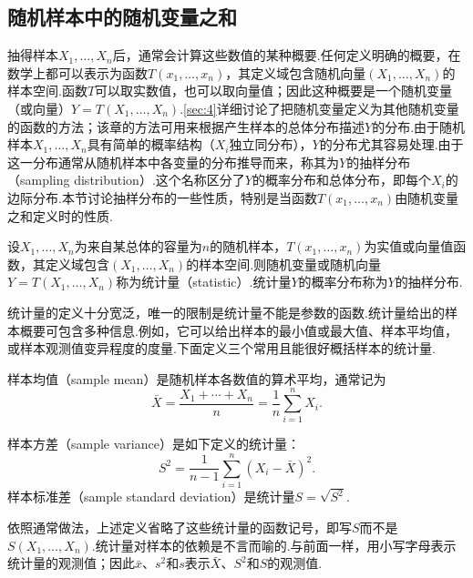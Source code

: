 \subsection{随机样本中的随机变量之和}\label{sec:5.2}
抽得样本$X_1,\ldots,X_n$后，通常会计算这些数值的某种概要.任何定义明确的概要，在数学上都可以表示为函数$T(x_1,\ldots,x_n)$，其定义域包含随机向量$(X_1,\ldots,X_n)$的样本空间.函数$T$可以取实数值，也可以取向量值；因此这种概要是一个随机变量（或向量）$Y=T(X_1,\ldots,X_n)$.\autoref{sec:4}详细讨论了把随机变量定义为其他随机变量的函数的方法；该章的方法可用来根据产生样本的总体分布描述$Y$的分布.由于随机样本$X_1,\ldots,X_n$具有简单的概率结构（$X_i$独立同分布），$Y$的分布尤其容易处理.由于这一分布通常从随机样本中各变量的分布推导而来，称其为$Y$的抽样分布（sampling distribution）.这个名称区分了$Y$的概率分布和总体分布，即每个$X_i$的边际分布.本节讨论抽样分布的一些性质，特别是当函数$T(x_1,\ldots,x_n)$由随机变量之和定义时的性质.
\begin{definition}\label{def:5.2.1}
设$X_1,\ldots,X_n$为来自某总体的容量为$n$的随机样本，$T(x_1,\ldots,x_n)$为实值或向量值函数，其定义域包含$(X_1,\ldots,X_n)$的样本空间.则随机变量或随机向量$Y=T(X_1,\ldots,X_n)$称为统计量（statistic）.统计量$Y$的概率分布称为$Y$的抽样分布.
\end{definition}
统计量的定义十分宽泛，唯一的限制是统计量不能是参数的函数.统计量给出的样本概要可包含多种信息.例如，它可以给出样本的最小值或最大值、样本平均值，或样本观测值变异程度的度量.下面定义三个常用且能很好概括样本的统计量.
\begin{definition}\label{def:5.2.2}
样本均值（sample mean）是随机样本各数值的算术平均，通常记为
$$\bar X=\frac{X_1+\cdots+X_n}{n}=\frac1n\sum_{i=1}^nX_i.$$
\end{definition}
\begin{definition}\label{def:5.2.3}
样本方差（sample variance）是如下定义的统计量：
$$S^2=\frac1{n-1}\sum_{i=1}^n(X_i-\bar X)^2.$$
样本标准差（sample standard deviation）是统计量$S=\sqrt{S^2}$.
\end{definition}
依照通常做法，上述定义省略了这些统计量的函数记号，即写$S$而不是$S(X_1,\ldots,X_n)$.统计量对样本的依赖是不言而喻的.与前面一样，用小写字母表示统计量的观测值；因此$\bar x$、$s^2$和$s$表示$\bar X$、$S^2$和$S$的观测值.

